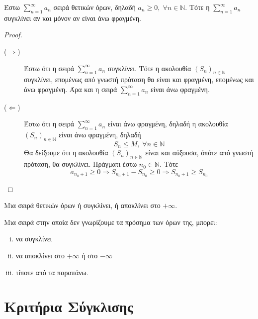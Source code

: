 \documentclass[main.tex]{subfiles}
\begin{document}
\begin{thm}
    Έστω $ \sum_{n=1}^{\infty} a_{n} $ σειρά θετικών όρων, δηλαδή $ a_{n} \geq 0, 
    \; \forall n \in \mathbb{N} $. Τότε η $ \sum_{n=1}^{\infty} a_{n} $ συγκλίνει 
    αν και μόνον αν είναι άνω φραγμένη.
\end{thm}
\begin{proof}
\item {}
    \begin{description}
        \item [($ \Rightarrow $)]
            Έστω ότι η σειρά $ \sum_{n=1}^{\infty} a_{n} $ συγκλίνει. Τότε η ακολουθία 
            $ {(S_{n})}_{n \in \mathbb{N}} $ συγκλίνει, επομένως από γνωστή πρόταση θα 
            είναι και φραγμένη, επομένως και άνω φραγμένη. Άρα και η σειρά 
            $ \sum_{n=1}^{\infty} a_{n} $ είναι άνω φραγμένη.
        \item [($ \Leftarrow $)]
            Έστω ότι η σειρά $ \sum_{n=1}^{\infty} a_{n} $ είναι άνω φραγμένη, δηλαδή 
            η ακολουθία $ {(S_{n})}_{n \in \mathbb{N}} $ είναι άνω φραγμένη, δηλαδή 
            \[
                S_{n} \leq M, \; \forall n \in \mathbb{N}
            \] 
            Θα δείξουμε ότι η ακολουθία $ {(S_{n})}_{n \in \mathbb{N}} $ είναι και 
            αύξουσα, όπότε από γνωστή πρόταση, θα συγκλίνει. Πράγματι
            έστω $ n_{0} \in \mathbb{N} $. Τότε
            \[
                a_{n_{0}+1} \geq 0 \Rightarrow S_{n_{0}+1} - S_{n_{0}} \geq 0 
                \Rightarrow S_{n_{0}+1} \geq S_{n_{0}}
            \] 
    \end{description}
\end{proof}

\begin{cor}
    Μια σειρά θετικών όρων ή συγκλίνει, ή αποκλίνει στο $ + \infty $.  
\end{cor}

\begin{rem}
    Μια σειρά στην οποία δεν γνωρίζουμε τα πρόσημα των όρων της, μπορει:
    \begin{enumerate}[i)]
        \item να συγκλίνει
        \item να αποκλίνει στο $ + \infty $ ή στο $ - \infty $
        \item τίποτε από τα παραπάνω.
    \end{enumerate}
\end{rem}



\section{Κριτήρια Σύγκλισης}
\end{document}
